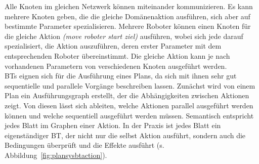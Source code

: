 Alle Knoten im gleichen Netzwerk können miteinander kommunizieren.
Es kann mehrere Knoten geben, die die gleiche Domänenaktion ausführen, sich aber auf bestimmte Parameter spezialisieren.
Mehrere Roboter können einen Knoten für die gleiche Aktion \emph{(move roboter start ziel)} ausführen, wobei sich jede darauf spezialisiert, die Aktion auszuführen, deren erster Parameter mit dem entsprechenden Roboter übereinstimmt.
Die gleiche Aktion kann je nach vorhandenen Parametern von verschiedenen Knoten ausgeführt werden.\\
\acp{BT} eignen sich für die Ausführung eines Plans, da sich mit ihnen sehr gut sequentielle und parallele Vorgänge beschreiben lassen.
Zunächst wird von einem Plan ein Ausführungsgraph erstellt, der die Abhängigkeiten zwischen Aktionen zeigt.
Von diesen lässt sich ableiten, welche Aktionen parallel ausgeführt werden können und welche sequentiell ausgeführt werden müssen.
Semantisch entspricht jedes Blatt im Graphen einer Aktion.
In der Praxis ist jedes Blatt ein eigenständiger \ac{BT}, der nicht nur die selbst Aktion ausführt, sondern auch die Bedingungen überprüft und die Effekte ausführt (s. Abbildung~\ref{fig:plansysbtaction}).\\

